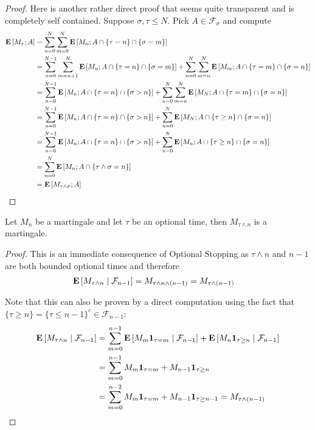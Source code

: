 \begin{proof}
Here is another rather direct proof that seems quite transparent and
is completely self contained.
Suppose $\sigma, \tau \leq N$.  Pick $A \in \mathcal{F}_\sigma$ and
compute
\begin{align*}
\expectation{M_\tau ; A} &= \sum_{n=0}^N \sum_{m=0}^N \expectation{M_n
  ; A \cap \lbrace \tau = n \rbrace \cap \lbrace \sigma = m\rbrace} \\
&=\sum_{n=0}^{N-1} \sum_{m=n+1}^N \expectation{M_n
  ; A \cap \lbrace \tau = n \rbrace \cap \lbrace \sigma = m\rbrace} + \sum_{n=0}^{N} \sum_{m=n}^N \expectation{M_m
  ; A \cap \lbrace \tau = m \rbrace \cap \lbrace \sigma = n\rbrace}\\
&=\sum_{n=0}^{N-1} \expectation{M_n
  ; A \cap \lbrace \tau = n \rbrace \cap \lbrace \sigma > n\rbrace} + \sum_{n=0}^{N} \sum_{m=n}^N \expectation{M_N
  ; A \cap \lbrace \tau = m \rbrace \cap \lbrace \sigma = n\rbrace}\\
&=\sum_{n=0}^{N-1} \expectation{M_n ; A \cap \lbrace \tau = n \rbrace
  \cap \lbrace \sigma > n\rbrace} + 
\sum_{n=0}^{N} \expectation{M_N  ; A \cap \lbrace \tau \geq n \rbrace \cap \lbrace \sigma = n\rbrace}\\
&=\sum_{n=0}^{N-1} \expectation{M_n ; A \cap \lbrace \tau = n \rbrace
  \cap \lbrace \sigma > n\rbrace} + 
\sum_{n=0}^{N} \expectation{M_n  ; A \cap \lbrace \tau \geq n \rbrace
  \cap \lbrace \sigma = n\rbrace}\\
&=\sum_{n=0}^{N} \expectation{M_n  ; A \cap \lbrace \tau \wedge \sigma = n \rbrace}\\
&=\expectation{M_{\tau \wedge \sigma} ; A}
\end{align*}
\end{proof}

\begin{cor}Let $M_n$ be a martingale and let $\tau$ be an optional
  time, then $M_{\tau \wedge n}$ is a martingale.
\end{cor}
\begin{proof}
This is an immediate consequence of Optional Stopping as $\tau \wedge
n$ and $n-1$ are both bounded optional times and therefore 
\begin{align*}
\cexpectationlong{\mathcal{F}_{n-1}}{M_{\tau \wedge n}} &= M_{\tau
  \wedge n \wedge (n-1)} = M_{\tau \wedge (n-1)}
\end{align*}

Note that this can also be proven by a direct computation using the
fact that $\lbrace \tau \geq n \rbrace = \lbrace \tau \leq n-1
\rbrace^c \in \mathcal{F}_{n-1}$:
\begin{align*}
\cexpectationlong{\mathcal{F}_{n-1}}{M_{\tau \wedge n}} &=
\sum_{m=0}^{n-1} \cexpectationlong{\mathcal{F}_{n-1}}{M_m
  \characteristic{\tau=m}} + \cexpectationlong{\mathcal{F}_{n-1}}{M_n
\characteristic{\tau \geq n}} \\
&= \sum_{m=0}^{n-1} M_m  \characteristic{\tau=m} + M_{n-1}
\characteristic{\tau \geq n} \\
&= \sum_{m=0}^{n-2} M_m  \characteristic{\tau=m} + M_{n-1}
\characteristic{\tau \geq n-1} = M_{\tau \wedge (n-1)}\\
\end{align*}
\end{proof}

